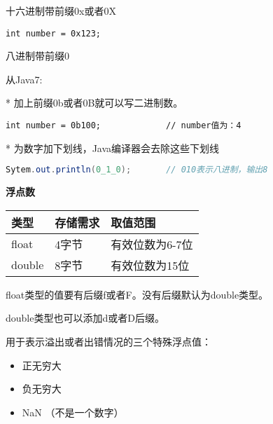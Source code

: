 十六进制带前缀0x或者0X

\begin{lstlisting}[style=cjava]
        int number = 0x123;       
\end{lstlisting}

八进制带前缀0

从Java7:

* 加上前缀0b或者0B就可以写二进制数。

\begin{lstlisting}[style=cjava]
        int number = 0b100;             // number值为：4
\end{lstlisting}

* 为数字加下划线，Java编译器会去除这些下划线

\begin{lstlisting}[language=java]
        Sytem.out.println(0_1_0);       // 010表示八进制，输出8
\end{lstlisting}




\textbf{浮点数}


\renewcommand\arraystretch{2}
\begin{tabular}{l|l|l}
    类型         &      存储需求        &     取值范围        \\               \hline
    float        &       4字节          & 有效位数为6-7位      \\
    double      &       8字节          & 有效位数为15位       \\
\end{tabular}\newline


float类型的值要有后缀f或者F。没有后缀默认为double类型。

double类型也可以添加d或者D后缀。


用于表示溢出或者出错情况的三个特殊浮点值：

\begin{itemize}
        \item   正无穷大  
        \item   负无穷大
        \item   NaN （不是一个数字）
\end{itemize}

